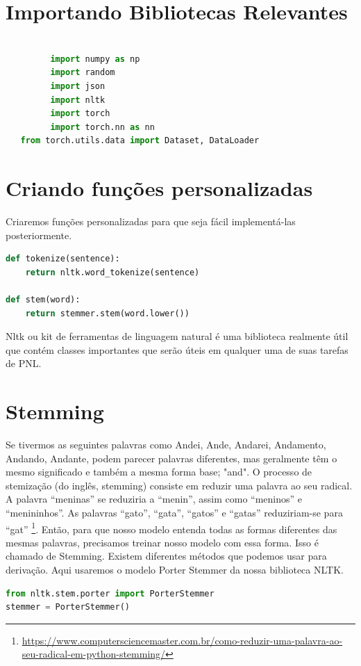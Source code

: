\section[Importando Bibliotecas Relevantes]{Importando Bibliotecas Relevantes}
\begin{lstlisting}[language=Python, caption=Python Bibliotecas]

         import numpy as np
         import random
         import json
         import nltk
         import torch
         import torch.nn as nn
   from torch.utils.data import Dataset, DataLoader
\end{lstlisting}

\section[Criando funções personalizadas]{Criando funções personalizadas}
Criaremos funções personalizadas para que seja fácil implementá-las posteriormente.
\justifying
\begin{lstlisting}[language=Python, caption=Python Funções personalizadas]
def tokenize(sentence):
    return nltk.word_tokenize(sentence)

def stem(word):
    return stemmer.stem(word.lower())

\end{lstlisting}
Nltk ou kit de ferramentas de linguagem natural é uma biblioteca realmente útil que contém classes importantes que serão úteis em qualquer uma de suas tarefas de PNL.
\justifying
\section[Stemming]{Stemming}


Se tivermos as seguintes palavras como Andei, Ande, Andarei, Andamento, Andando, Andante, podem parecer palavras diferentes, mas geralmente têm o mesmo significado e também a mesma forma base; "and".
O processo de stemização (do inglês, stemming) consiste em reduzir uma palavra ao seu radical. A palavra “meninas” se reduziria a “menin”, assim como “meninos” e “menininhos”. As palavras “gato”, “gata”, “gatos” e “gatas” reduziriam-se para “gat” \footnote{\url{https://www.computersciencemaster.com.br/como-reduzir-uma-palavra-ao-seu-radical-em-python-stemming/}}.
Então, para que nosso modelo entenda todas as formas diferentes das mesmas palavras, precisamos treinar nosso modelo com essa forma. Isso é chamado de Stemming. Existem diferentes métodos que podemos usar para derivação. Aqui usaremos o modelo Porter Stemmer da nossa biblioteca NLTK.
\justifying
\begin{lstlisting}[language=Python, caption=Python Stemming]
from nltk.stem.porter import PorterStemmer
stemmer = PorterStemmer()
\end{lstlisting}

